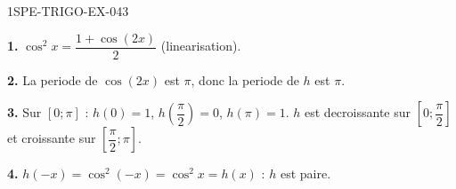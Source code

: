 \begin{corrige}{1SPE-TRIGO-EX-043}

\textbf{1.} $\cos^2 x = \dfrac{1+\cos(2x)}{2}$ (linearisation).

\textbf{2.} La periode de $\cos(2x)$ est $\pi$, donc la periode de $h$ est $\pi$.

\textbf{3.} Sur $[0;\pi]$ : $h(0) = 1$, $h\!\left(\dfrac{\pi}{2}\right) = 0$, $h(\pi) = 1$. $h$ est decroissante sur $\left[0;\dfrac{\pi}{2}\right]$ et croissante sur $\left[\dfrac{\pi}{2};\pi\right]$.

\textbf{4.} $h(-x) = \cos^2(-x) = \cos^2 x = h(x)$ : $h$ est paire.

\end{corrige}
